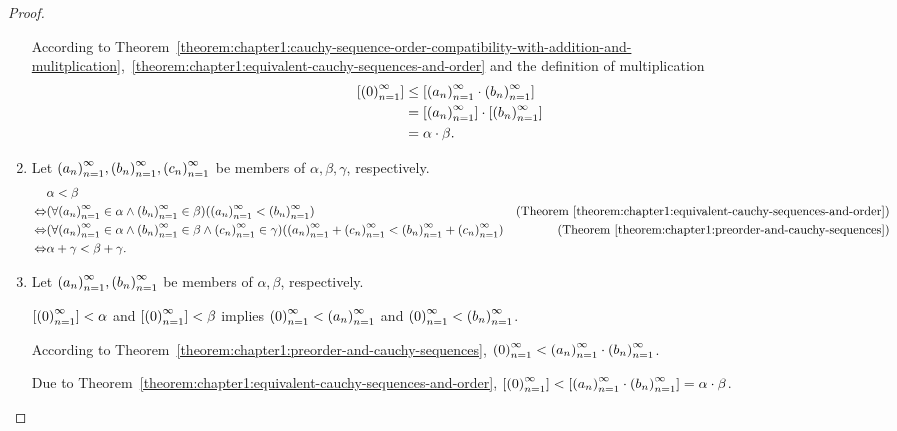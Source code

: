 \begin{proof}
\begin{enumerate}[label={(\roman*)}]
              According to Theorem~\ref{theorem:chapter1:cauchy-sequence-order-compatibility-with-addition-and-mulitplication},~\ref{theorem:chapter1:equivalent-cauchy-sequences-and-order} and the definition of multiplication
              \begin{align*}
                  \left[{{\left({0}\right)}^{\infty}_{n=1}}\right] & \le \left[{{\left({a_{n}}\right)}^{\infty}_{n=1}\cdot{\left({b_{n}}\right)}^{\infty}_{n=1}}\right]       \\
                                  & = \left[{{\left({a_{n}}\right)}^{\infty}_{n=1}}\right]\cdot\left[{{\left({b_{n}}\right)}^{\infty}_{n=1}}\right] \\
                                  & = \alpha\cdot\beta.
              \end{align*}
        \item Let ${\left({a_{n}}\right)}^{\infty}_{n=1}, {\left({b_{n}}\right)}^{\infty}_{n=1}, {\left({c_{n}}\right)}^{\infty}_{n=1}$ be members of $\alpha, \beta, \gamma$, respectively.
              \begin{align*}
                                  & \alpha < \beta                                                                                                                                                                                                             \\
                  \Leftrightarrow & (\forall {\left({a_{n}}\right)}^{\infty}_{n=1}\in\alpha\land {\left({b_{n}}\right)}^{\infty}_{n=1}\in\beta) ({\left({a_{n}}\right)}^{\infty}_{n=1} < {\left({b_{n}}\right)}^{\infty}_{n=1})                                                        & \text{(Theorem~\ref{theorem:chapter1:equivalent-cauchy-sequences-and-order})} \\
                  \Leftrightarrow & (\forall {\left({a_{n}}\right)}^{\infty}_{n=1}\in\alpha\land {\left({b_{n}}\right)}^{\infty}_{n=1}\in\beta \land {\left({c_{n}}\right)}^{\infty}_{n=1}\in\gamma) ({\left({a_{n}}\right)}^{\infty}_{n=1} + {\left({c_{n}}\right)}^{\infty}_{n=1} < {\left({b_{n}}\right)}^{\infty}_{n=1} + {\left({c_{n}}\right)}^{\infty}_{n=1}) & \text{(Theorem~\ref{theorem:chapter1:preorder-and-cauchy-sequences})}         \\
                  \Leftrightarrow & \alpha + \gamma < \beta + \gamma.
              \end{align*}
        \item Let ${\left({a_{n}}\right)}^{\infty}_{n=1}, {\left({b_{n}}\right)}^{\infty}_{n=1}$ be members of $\alpha, \beta$, respectively.

              $\left[{{\left({0}\right)}^{\infty}_{n=1}}\right] < \alpha$ and $\left[{{\left({0}\right)}^{\infty}_{n=1}}\right] < \beta$ implies ${\left({0}\right)}^{\infty}_{n=1} < {\left({a_{n}}\right)}^{\infty}_{n=1}$ and ${\left({0}\right)}^{\infty}_{n=1} < {\left({b_{n}}\right)}^{\infty}_{n=1}$.

              According to Theorem~\ref{theorem:chapter1:preorder-and-cauchy-sequences}, ${\left({0}\right)}^{\infty}_{n=1} < {\left({a_{n}}\right)}^{\infty}_{n=1}\cdot{\left({b_{n}}\right)}^{\infty}_{n=1}$.

              Due to Theorem~\ref{theorem:chapter1:equivalent-cauchy-sequences-and-order}, $\left[{{\left({0}\right)}^{\infty}_{n=1}}\right] < \left[{{\left({a_{n}}\right)}^{\infty}_{n=1}\cdot{\left({b_{n}}\right)}^{\infty}_{n=1}}\right] = \alpha\cdot\beta$.\qedhere
    \end{enumerate}
\end{proof}

